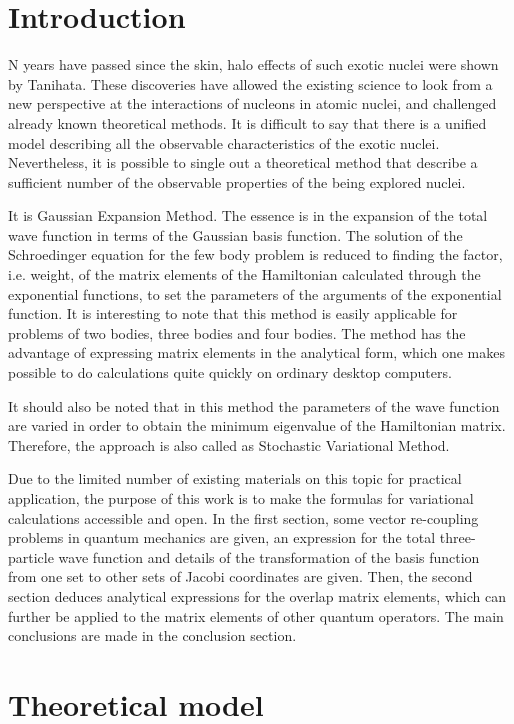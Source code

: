 \documentclass[12pt,a4paper,twoside]{article}
\begin{document}
\section*{Introduction}

N years have passed since the skin, halo effects of such exotic nuclei were shown by Tanihata. These discoveries have allowed the existing science to look from a new perspective at the interactions of nucleons in atomic nuclei, and challenged already known theoretical methods. It is difficult to say that there is a unified model describing all the observable characteristics of the exotic nuclei. Nevertheless, it is possible to single out a theoretical method that describe a sufficient number of the observable properties of the being explored nuclei.


It is Gaussian Expansion Method. The essence is in the expansion of the total wave function in terms of the Gaussian basis function. The solution of the Schroedinger equation for the few body problem is reduced to finding the factor, i.e. weight, of the matrix elements of the Hamiltonian calculated through the exponential functions, to set the parameters of the arguments of the exponential function. It is interesting to note that this method is easily applicable for problems of two bodies, three bodies and four bodies. The method has the advantage of expressing matrix elements in the analytical form, which one makes possible to do calculations quite quickly on ordinary desktop computers.

It should also be noted that in this method the parameters of the wave function are varied in order to obtain the minimum eigenvalue of the Hamiltonian matrix. Therefore, the approach is also called as Stochastic Variational Method.

Due to the limited number of existing materials on this topic for practical application, the purpose of this work is to make the formulas for variational calculations accessible and open. In the first section, some vector re-coupling problems in quantum mechanics are given, an expression for the total three-particle wave function and details of the transformation of the basis function from one set to other sets of Jacobi coordinates are given. Then, the second section deduces analytical expressions for the overlap matrix elements, which can further be applied to the matrix elements of other quantum operators. The main conclusions are made in the conclusion section.

\section*{Theoretical model}
\end{document}

